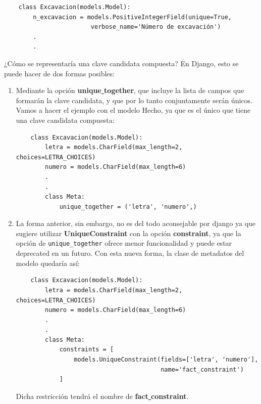     
    \begin{verbatim}
    class Excavacion(models.Model):
        n_excavacion = models.PositiveIntegerField(unique=True, 
                        verbose_name='Número de excavación')
        .
        .
    \end{verbatim}

    ¿Cómo se representaría una clave candidata compuesta? En Django, esto se puede hacer de
    dos formas posibles:

    \begin{enumerate}
        \item Mediante la opción \textbf{unique\underline{ }together}, que incluye la lista
        de campos que formarán la clave candidata, y que por lo tanto conjuntamente serán
        únicos. Vamos a hacer el ejemplo con el modelo Hecho, ya que es el único que tiene
        una clave candidata compuesta:
        
    
    \begin{verbatim}
    class Excavacion(models.Model):
        letra = models.CharField(max_length=2, choices=LETRA_CHOICES)
        numero = models.CharField(max_length=6)    
        .
        .
        class Meta:
            unique_together = ('letra', 'numero',)
    \end{verbatim}

        \item La forma anterior, sin embargo, no es del todo aconsejable por django ya
        que sugiere utilizar \textbf{UniqueConstraint} con la opción \textbf{constraint},
        ya que la opción de \verb|unique_together| ofrece menor funcionalidad y puede
        estar deprecated en un futuro. Con esta nueva forma, la clase de metadatos
        del modelo quedaría así:
        
    
    \begin{verbatim}
    class Excavacion(models.Model):
        letra = models.CharField(max_length=2, choices=LETRA_CHOICES)
        numero = models.CharField(max_length=6)    
        .
        .
        class Meta:
            constraints = [
                models.UniqueConstraint(fields=['letra', 'numero'], 
                                        name='fact_constraint')                                                  
            ]
    \end{verbatim}

    Dicha restricción tendrá el nombre de \textbf{fact\underline{ }constraint}.
    \end{enumerate}

